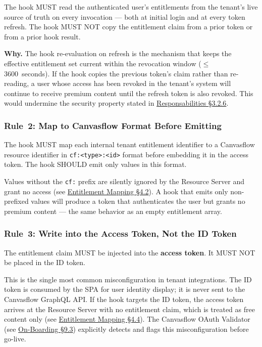 The hook MUST read the authenticated user's entitlements from the tenant's live source
of truth on every invocation --- both at initial login and at every token refresh. The
hook MUST NOT copy the entitlement claim from a prior token or from a prior hook result.

\textbf{Why.} The hook re-evaluation on refresh is the mechanism that keeps the effective
entitlement set current within the revocation window ($\leq$ 3600~seconds). If the hook
copies the previous token's claim rather than re-reading, a user whose access has been
revoked in the tenant's system will continue to receive premium content until the refresh
token is also revoked. This would undermine the security property stated in
\hyperref[sec:session-lifecycle]{Responsabilities \S3.2.6}.



\subsubsection{Rule~2: Map to Canvasflow Format Before Emitting}

The hook MUST map each internal tenant entitlement identifier to a Canvasflow resource
identifier in \texttt{cf:<type>:<id>} format before embedding it in the access token.
The hook SHOULD emit only values in this format.

Values without the \texttt{cf:} prefix are silently ignored by the Resource Server and
grant no access (see \hyperref[sec:mandatory-value-format]{Entitlement Mapping \S4.2}). A hook that emits only
non-prefixed values will produce a token that authenticates the user but grants no
premium content --- the same behavior as an empty entitlement array.

\subsubsection{Rule~3: Write into the Access Token, Not the ID Token}

The entitlement claim MUST be injected into the \textbf{access token}. It MUST NOT be
placed in the ID token.

This is the single most common misconfiguration in tenant integrations. The ID token is
consumed by the SPA for user identity display; it is never sent to the Canvasflow GraphQL
API. If the hook targets the ID token, the access token arrives at the Resource Server
with no entitlement claim, which is treated as free content only (see
\hyperref[sec:free-content-baseline]{Entitlement Mapping \S4.4}). The Canvasflow OAuth Validator (see
\hyperref[sec:tenant-side-setup]{On-Boarding \S9.3}) explicitly detects and flags this misconfiguration
before go-live.

